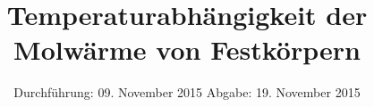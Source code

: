 

\subject{Fortgeschrittenen Praktikum - V47}
\title{Temperaturabhängigkeit der Molwärme von
Festkörpern}
\date{
  Durchführung: 09. November 2015
  \hspace{1em}
  Abgabe: 19. November 2015
}



\maketitle
\thispagestyle{empty}
\tableofcontents
\newpage






\printbibliography


